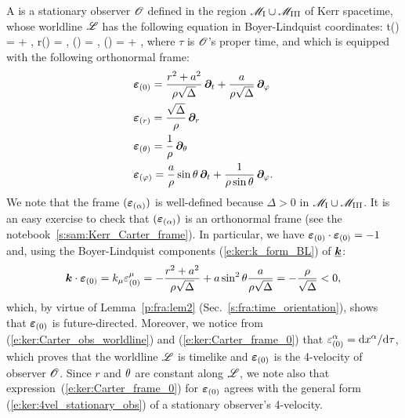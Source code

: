 A 
is a stationary observer $\mathscr{O}$ defined in the region $\mathscr{M}_{\rm I}\cup \mathscr{M}_{\rm III}$ of Kerr spacetime, whose
worldline $\mathscr{L}$ has the following equation in Boyer-Lindquist coordinates:
\be \label{e:ker:Carter_obs_worldline}
    t(\tau) = \tau  + , \quad
    r(\tau) = ,\quad
    \th(\tau) = ,\quad
    \ph(\tau) =  \tau + ,
\ee
where $\tau$ is $\mathscr{O}$'s proper time,
and which is equipped with the following orthonormal frame:
\begin{subequations}
\begin{align}
  & \bm{\varepsilon}_{(0)} =
  \frac{r^2 + a^2}{\rho\sqrt{\Delta}} \,
  \bm{\partial}_t + \frac{a}{\rho \sqrt{\Delta}}\, \bm{\partial}_\varphi
    \label{e:ker:Carter_frame_0}\\
  & \bm{\varepsilon}_{(r)} = \frac{\sqrt{\Delta}}{\rho} \, \bm{\partial}_r
    \label{e:ker:Carter_frame_r} \\
  & \bm{\varepsilon}_{(\theta)} = \frac{1}{\rho} \, \bm{\partial}_\theta \\
  & \bm{\varepsilon}_{(\varphi)} =  \frac{a}{\rho}\sin\theta\, \bm{\partial}_t +
     \frac{1}{\rho\sin\theta} \, \bm{\partial}_\varphi .
\end{align}
\end{subequations}
We note that the frame $(\bm{\varepsilon}_{(\alpha)})$ is well-defined because $\Delta > 0$ in $\mathscr{M}_{\rm I}\cup \mathscr{M}_{\rm III}$.
It is an easy exercise to check that $(\bm{\varepsilon}_{(\alpha)})$ is an orthonormal frame
(see the notebook~\ref{s:sam:Kerr_Carter_frame}).
In particular, we have $\bm{\varepsilon}_{(0)} \cdot \bm{\varepsilon}_{(0)}  = -1$ and, using the
Boyer-Lindquist components
(\ref{e:ker:k_form_BL}) of $\underline{\bm{k}}$:
\[
    \bm{k}\cdot\bm{\varepsilon}_{(0)} = k_\mu \varepsilon_{(0)}^\mu = - \frac{r^2 + a^2}{\rho\sqrt{\Delta}}
        + a\sin^2\theta \frac{a}{\rho \sqrt{\Delta}} = - \frac{\rho}{\sqrt{\Delta}} < 0 ,
\]
which, by virtue of Lemma~\ref{p:fra:lem2} (Sec.~\ref{s:fra:time_orientation}),
shows that $\bm{\varepsilon}_{(0)}$ is future-directed. Moreover,
we notice from (\ref{e:ker:Carter_obs_worldline}) and (\ref{e:ker:Carter_frame_0})
that $\varepsilon_{(0)}^\alpha = \mathrm{d} x^\alpha / \mathrm{d}\tau$, which proves that the worldline $\mathscr{L}$ is
timelike and $\bm{\varepsilon}_{(0)}$ is the 4-velocity of observer $\mathscr{O}$.
Since $r$ and $\theta$ are constant along $\mathscr{L}$,
we note also that expression~(\ref{e:ker:Carter_frame_0}) for $\bm{\varepsilon}_{(0)}$ agrees with the
general form (\ref{e:ker:4vel_stationary_obs}) of a stationary observer's 4-velocity.

